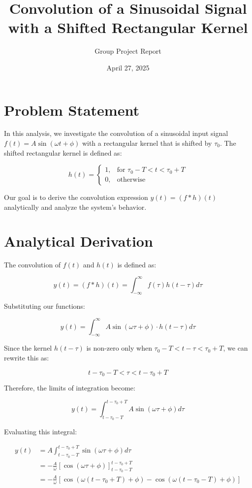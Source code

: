 \documentclass{article}
\title{Convolution of a Sinusoidal Signal with a Shifted Rectangular Kernel}
\author{Group Project Report}
\date{April 27, 2025}
\begin{document}
\maketitle

\section{Problem Statement}
In this analysis, we investigate the convolution of a sinusoidal input signal $f(t) = A\sin(\omega t + \phi)$ with a rectangular kernel that is shifted by $\tau_0$. The shifted rectangular kernel is defined as:

$$
h(t)= \begin{cases}
1, & \text{for } \tau_0-T < t < \tau_0+T \\
0, & \text{otherwise}
\end{cases}
$$

Our goal is to derive the convolution expression $y(t)=(f * h)(t)$ analytically and analyze the system's behavior.

\section{Analytical Derivation}

The convolution of $f(t)$ and $h(t)$ is defined as:

$$
y(t) = (f * h)(t) = \int_{-\infty}^{\infty} f(\tau)h(t-\tau)d\tau
$$

Substituting our functions:

$$
y(t) = \int_{-\infty}^{\infty} A\sin(\omega \tau + \phi) \cdot h(t-\tau)d\tau
$$

Since the kernel $h(t-\tau)$ is non-zero only when $\tau_0-T < t-\tau < \tau_0+T$, we can rewrite this as:

$$
t-\tau_0-T < \tau < t-\tau_0+T
$$

Therefore, the limits of integration become:

$$
y(t) = \int_{t-\tau_0-T}^{t-\tau_0+T} A\sin(\omega \tau + \phi)d\tau
$$

Evaluating this integral:

\begin{align*}
y(t) &= A\int_{t-\tau_0-T}^{t-\tau_0+T} \sin(\omega \tau + \phi)d\tau \\
&= -\frac{A}{\omega}[\cos(\omega \tau + \phi)]_{t-\tau_0-T}^{t-\tau_0+T} \\
&= -\frac{A}{\omega}[\cos(\omega(t-\tau_0+T) + \phi) - \cos(\omega(t-\tau_0-T) + \phi)]
\end{align*}
\end{document}
